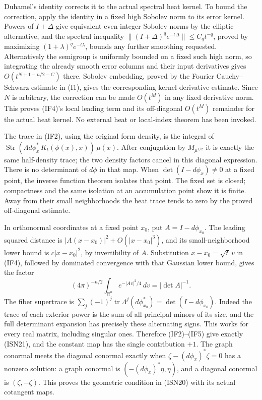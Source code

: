 \documentclass[
  11pt,
]{article}
\begin{document}
Duhamel's identity corrects it to the actual spectral heat kernel. To
bound the correction, apply the identity in a fixed high Sobolev norm to
its error kernel. Powers of \(I+\Delta\) give equivalent even-integer
Sobolev norms by the elliptic alternative, and the spectral inequality
\(\|(I+\Delta)^q e^{-t\Delta}\|\leq C_q t^{-q}\), proved by maximizing
\((1+\lambda)^qe^{-t\lambda}\), bounds any further smoothing requested.
Alternatively the semigroup is uniformly bounded on a fixed such high
norm, so integrating the already smooth error columns and their input
derivatives gives \(O(t^{N+1-n/2-C})\) there. Sobolev embedding, proved
by the Fourier Cauchy--Schwarz estimate in (I1), gives the corresponding
kernel-derivative estimate. Since \(N\) is arbitrary, the correction can
be made \(O(t^M)\) in any fixed derivative norm. This proves (IF4)'s
local leading term and its off-diagonal \(O(t^M)\) remainder for the
actual heat kernel. No external heat or local-index theorem has been
invoked.

The trace in (IF2), using the original form density, is the integral of
\(\operatorname{Str}(\Lambda d\phi_x^*\,K_t(\phi(x),x))\,\mu(x)\). After
conjugation by \(M_{\mu^{1/2}}\) it is exactly the same half-density
trace; the two density factors cancel in this diagonal expression. There
is no determinant of \(d\phi\) in that map. When \(\det(I-d\phi_x)\ne0\)
at a fixed point, the inverse function theorem isolates that point. The
fixed set is closed; compactness and the same isolation at an
accumulation point show it is finite. Away from their small
neighborhoods the heat trace tends to zero by the proved off-diagonal
estimate.

In orthonormal coordinates at a fixed point \(x_0\), put
\(A=I-d\phi_{x_0}\). The leading squared distance is
\(|A(x-x_0)|^2+O(|x-x_0|^3)\), and its small-neighborhood lower bound is
\(c|x-x_0|^2\), by invertibility of \(A\). Substitution
\(x-x_0=\sqrt t\,v\) in (IF4), followed by dominated convergence with
that Gaussian lower bound, gives the factor \[
 (4\pi)^{-n/2}\int_{\mathbb R^n}e^{-|Av|^2/4}\,dv
       =|\det A|^{-1}.
\tag{IF5}
\] The fiber supertrace is
\(\sum_j(-1)^j\operatorname{tr}\Lambda^j(d\phi_{x_0}^*)=\det(I-d\phi_{x_0})\).
Indeed the trace of each exterior power is the sum of all principal
minors of its size, and the full determinant expansion has precisely
these alternating signs. This works for every real matrix, including
singular ones. Therefore (IF2)--(IF5) give exactly (ISN21), and the
constant map has the single contribution \(+1\). The graph conormal
meets the diagonal conormal exactly when \(\zeta-(d\phi_x)^*\zeta=0\)
has a nonzero solution: a graph conormal is \((-(d\phi_x)^*\eta,\eta)\),
and a diagonal conormal is \((\zeta,-\zeta)\). This proves the geometric
condition in (ISN20) with its actual cotangent maps.
\end{document}
